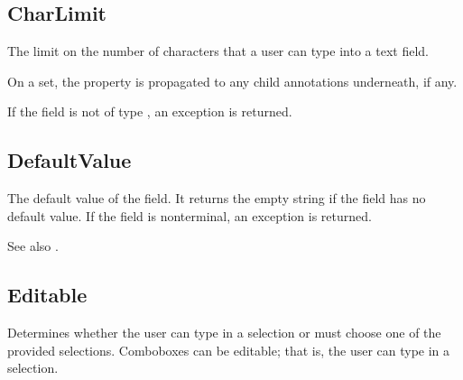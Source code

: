 \documentclass[letterpaper,12pt,english,openany,oneside]{sphinxmanual}
\begin{document}
\subsection{CharLimit}
\label{\detokenize{IAC_API_FormsIntro:charlimit}}
The limit on the number of characters that a user can type into a text field.

On a set, the property is propagated to any child annotations underneath, if any.

\label{\detokenize{IAC_API_FormsIntro:syntax-15}}

\begin{sphinxVerbatim}[commandchars=\\\{\}]
\PYG{p}{[}\PYG{p}{]} 
\end{sphinxVerbatim}
\label{\detokenize{IAC_API_FormsIntro:exceptions-9}}

If the field is not of type , an exception  is returned.




\subsection{DefaultValue}
\label{\detokenize{IAC_API_FormsIntro:defaultvalue}}
The default value of the field. It returns the empty string if the field has no default value. If the field is non\sphinxhyphen{}terminal, an exception  is returned.

\label{\detokenize{IAC_API_FormsIntro:syntax-16}}

\begin{sphinxVerbatim}[commandchars=\\\{\}]
\PYG{p}{[}\PYG{p}{]} 
\end{sphinxVerbatim}

See also  .




\subsection{Editable}
\label{\detokenize{IAC_API_FormsIntro:editable}}
Determines whether the user can type in a selection or must choose one of the provided selections. Comboboxes can be editable; that is, the user can type in a selection.
\end{document}
